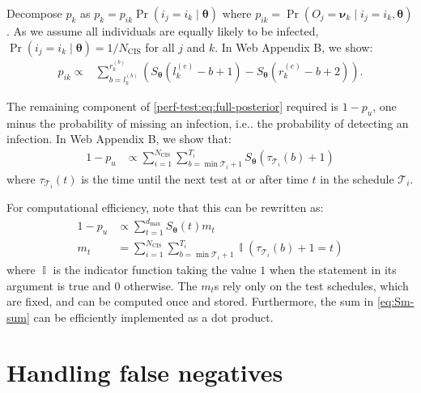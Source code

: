 \documentclass[referee,useAMS,usenatbib]{biom}
\makeatletter
\DeclareMathOperator{\prob}{\mathrm{Pr}}
\DeclareMathOperator{\indicator}{\mathbb{I}}
\renewcommand{\vec}[1]{\bm{#1}}
\newcommand{\dmax}{d_\text{max}}
\newcommand{\Ncis}{N_\text{CIS}}
\newcommand{\sched}{\mathcal{T}}
\DeclareRobustCommand\onedot{\futurelet\@let@token\@onedot}
\def\@onedot{\ifx\@let@token.\else.\null\fi\xspace}
\def\ie{i.e\onedot} \def\Ie{{I.e}\onedot}
\makeatother
\begin{document}
Decompose $p_k$ as $p_k = p_{ik} \prob(i_j = i_k \mid \vec{\theta})$
where $p_{ik} = \prob(O_j = \vec{\nu}_k \mid i_j = i_k, \vec{\theta})$.
As we assume all individuals are equally likely to be infected, $\prob(i_j = i_k \mid \vec{\theta}) = 1/\Ncis$ for all $j$ and $k$.
In Web Appendix B, we show:
\begin{align}
p_{ik}
\propto& \sum_{b = l_k^{(b)}}^{r_k^{(b)}} \left( S_{\vec{\theta}}(l_k^{(e)} - b + 1) - S_{\vec{\theta}}(r_k^{(e)} - b + 2) \right).
\label{perf-test:eq:pia}
\end{align}

The remaining component of \cref{perf-test:eq:full-posterior} required is $1- p_u$, one minus the probability of missing an infection, \ie the probability of detecting an infection.
In Web Appendix B, we show that:
\begin{align}
  1 - p_u
  &\propto \sum_{i=1}^{\Ncis}\sum_{b = \min \sched_{i} + 1}^{T_{i}} S_{\vec{\theta}}(\tau_{\sched_{i}}(b) + 1)
  \label{eq:1minuspu}
\end{align}
where $\tau_{\sched_i}(t)$ is the time until the next test at or after time $t$ in the schedule $\sched_i$.

For computational efficiency, note that this can be rewritten as:
\begin{align}
  1- p_u
  &\propto \sum_{t=1}^{\dmax} S_{\vec\theta}(t) m_t
  \label{eq:Sm-sum} \\
  m_t &= \sum_{i=1}^{\Ncis} \sum_{b = \min \sched_{i} + 1}^{T_{i}} \indicator(\tau_{\sched_{i}}(b) + 1 = t)
\end{align}
where $\indicator$ is the indicator function taking the value $1$ when the statement in its argument is true and $0$ otherwise.
The $m_t$s rely only on the test schedules, which are fixed, and can be computed once and stored.
Furthermore, the sum in \cref{eq:Sm-sum} can be efficiently implemented as a dot product.

\section{Handling false negatives} \label{sec:false-negatives}
\end{document}

